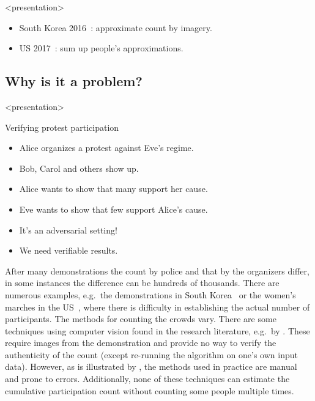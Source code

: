 \begin{frame}<presentation>
  \begin{example}
    \begin{itemize}
      \item South Korea 2016~\cite{2016DemonstrationsInSeoul}:
        approximate count by imagery.

      \item US 2017~\cite{2017WomensMarchesInUS}:
        sum up people's approximations.
    \end{itemize}
  \end{example}
\end{frame}

\subsection<presentation>{Why is it a problem?}

\begin{frame}<presentation>
  \begin{block}{Verifying protest participation}
    \begin{itemize}
      \item Alice organizes a protest against Eve's regime.
      \item Bob, Carol and others show up.

        \pause

      \item {\color{green} Alice wants to show that many support her cause.}

        \pause

      \item {\color{red} Eve wants to show that few support Alice's cause.}

        \pause

      \item It's an adversarial setting!
      \item We need verifiable results.
    \end{itemize}
  \end{block}
\end{frame}

After many demonstrations the count by police and that by the organizers 
differ, in some instances the difference can be hundreds of thousands.
There are numerous examples, e.g.\ the demonstrations in South 
Korea~\cite{2016DemonstrationsInSeoul} or the women's marches in the 
US~\cite{2017WomensMarchesInUS}, where there is difficulty in establishing the 
actual number of participants.
The methods for counting the crowds vary.
There are some techniques using computer vision found in the research 
literature, e.g.\ by \textcite{CVCrowdCounting}.
These require images from the demonstration and provide no way to verify the 
authenticity of the count (except re-running the algorithm on one's own input 
data).
However, as is illustrated by 
\textcite{2016DemonstrationsInSeoul,2017WomensMarchesInUS}, the methods used in 
practice are manual and prone to errors.
Additionally, none of these techniques can estimate the cumulative 
participation count without counting some people multiple times.

